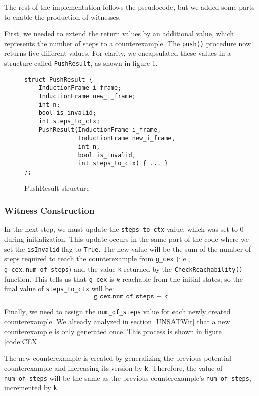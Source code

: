 \noindent The rest of the implementation follows the pseudocode, but we added
some parts to enable the production of witnesses.

First, we needed to extend the return values by an additional value, which
represents the number of steps to a counterexample. The \texttt{push()}
procedure now returns five different values. For clarity, we encapsulated these
values in a structure called \texttt{PushResult}, as shown in
figure \ref{code:PushResult}.

\begin{figure}[H]
\begin{lstlisting}
struct PushResult {
    InductionFrame i_frame;
    InductionFrame new_i_frame;
    int n;
    bool is_invalid;
    int steps_to_ctx;
    PushResult(InductionFrame i_frame,
               InductionFrame new_i_frame,
               int n,
               bool is_invalid,
               int steps_to_ctx) { ... }
};
\end{lstlisting}
\caption{PushResult structure}\label{code:PushResult}
\end{figure}

\subsubsection{Witness Construction}

\noindent In the next step, we must update the \texttt{steps\_to\_ctx} value,
which was set to 0 during initialization. This update occurs in the same part
of the code where we set the \texttt{isInvalid} flag to \texttt{True}. The new
value will be the sum of the number of steps required to reach the
counterexample from \texttt{g\_cex} (i.e., \texttt{g\_cex.num\_of\_steps}) and
the value \texttt{k} returned by the \texttt{CheckReachability()} function.
This tells us that \texttt{g\_cex} is \( k \)-reachable from the initial
states, so the final value of \texttt{steps\_to\_ctx} will be:  
\[
\texttt{g\_cex.num\_of\_steps + k}
\]

Finally, we need to assign the \texttt{num\_of\_steps} value for each newly
created counterexample. We already analyzed in section \ref{UNSATWit}
that a new counterexample is only generated once.
This process is shown in figure \ref{code:CEX}.

The new counterexample is created by generalizing the previous potential
counterexample and increasing its version by \texttt{k}. Therefore, the value
of \texttt{num\_of\_steps} will be the same as the previous counterexample's
\texttt{num\_of\_steps}, incremented by \texttt{k}.

